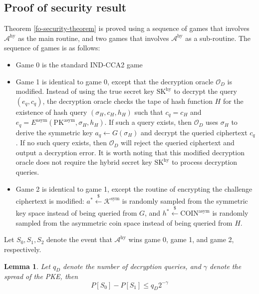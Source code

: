 \documentclass{article}
\newcommand{\leftsample}{\overset{{\scriptscriptstyle\$}}{\leftarrow}}
\newtheorem{lemma}{Lemma}[theorem]
\begin{document}
\subsection{Proof of security result}
Theorem \ref{fo-security-theorem} is proved using a sequence of games that involves $\mathcal{A}^\text{hy}$ as the main routine, and two games that involves $\mathcal{A}^\text{hy}$ as a sub-routine. The sequence of games is as follows:

\begin{itemize}
    \item Game 0 is the standard IND-CCA2 game

    \item Game 1 is identical to game 0, except that the decryption oracle $\mathcal{O}_D$ is modified. Instead of using the true secret key $\text{SK}^\text{hy}$ to decrypt the query $(e_q, c_q)$, the decryption oracle checks the tape of hash function $H$ for the existence of hash query $(\sigma_H, c_H, h_H)$ such that $c_q = c_H$ and $e_q = E^\text{asym}(\text{PK}^\text{asym}, \sigma_H, h_H)$. If such a query exists, then $\mathcal{O}_D$ uses $\sigma_H$ to derive the symmetric key $a_q \leftarrow G(\sigma_H)$ and decrypt the queried ciphertext $c_q$. If no such query exists, then $\mathcal{O}_D$ will reject the queried ciphertext and output a decryption error. It is worth noting that this modified decryption oracle does not require the hybrid secret key $\text{SK}^\text{hy}$ to process decryption queries.

    \item Game 2 is identical to game 1, except the routine of encrypting the challenge ciphertext is modified: $a^\ast \leftsample \mathcal{K}^\text{sym}$ is randomly sampled from the symmetric key space instead of being queried from $G$, and $h^\ast \leftsample \text{COIN}^\text{asym}$ is randomly sampled from the asymmetric coin space instead of being queried from $H$.
\end{itemize}

Let $S_0, S_1, S_2$ denote the event that $\mathcal{A}^\text{hy}$ wins game 0, game 1, and game 2, respectively.

\begin{lemma}\label{fo-win0-win1}
    Let $q_D$ denote the number of decryption queries, and $\gamma$ denote the spread of the PKE, then
    \begin{equation*}
        P[S_0] - P[S_1] \leq q_D 2^{-\gamma}
    \end{equation*}
\end{lemma}
\end{document}
